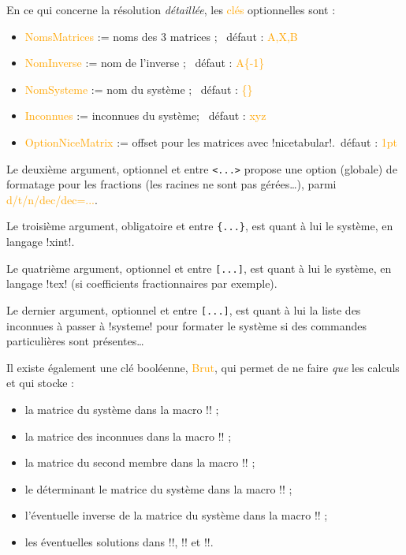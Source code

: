 \documentclass[french,a4paper,11pt]{article}
\newcommand\Cle[1]{{\small\sffamily\textlangle \textcolor{orange}{#1}\textrangle}}
\begin{document}
{{\begin{tipblock}
En ce qui concerne la résolution \textit{détaillée}, les \Cle{clés} optionnelles sont :

\begin{itemize}
	\item \Cle{NomsMatrices} := noms des 3 matrices ; \hfill~défaut : \Cle{A,X,B}
	\item \Cle{NomInverse} := nom de l'inverse ; \hfill~défaut : \Cle{A\{-1\}}
	\item \Cle{NomSysteme} := nom du système ; \hfill~défaut : \Cle{\{\}}
	\item \Cle{Inconnues} := inconnues du système; \hfill~défaut : \Cle{xyz}
	\item \Cle{OptionNiceMatrix} := offset pour les matrices avec \motcletex!nicetabular!.\hfill~défaut : \Cle{1pt}
\end{itemize}

Le deuxième argument, optionnel et entre \texttt{<...>} propose une option (globale) de formatage pour les fractions (les racines ne sont pas gérées\ldots), parmi \Cle{d/t/n/dec/dec=...}.

\smallskip

Le troisième argument, obligatoire et entre \texttt{\{...\}}, est quant à lui le système, en langage \motcletex!xint!.

\smallskip

Le quatrième argument, optionnel et entre \texttt{[...]}, est quant à lui le système, en langage \motcletex!tex! (si coefficients fractionnaires par exemple).

\smallskip

Le dernier argument, optionnel et entre \texttt{[...]}, est quant à lui la liste des inconnues à passer à \motcletex!systeme! pour formater le système si des commandes particulières sont présentes\ldots
\end{tipblock}

\begin{tipblock}
Il existe également une clé booléenne, \Cle{Brut}, qui permet de ne faire \textit{que} les calculs et qui stocke :

\begin{itemize}
	\item la matrice du système dans la macro \motcletex!\ResolMatA! ;
	\item la matrice des inconnues dans la macro \motcletex!\ResolMatX! ;
	\item la matrice du second membre dans la macro \motcletex!\ResolMatB! ;
	\item le déterminant le matrice du système dans la macro \motcletex!\ResolDet! ;
	\item l'éventuelle inverse de la matrice du système dans la macro \motcletex!\ResolInvMatA! ;
	\item les éventuelles solutions dans \motcletex!\ResolSolX!, \motcletex!\ResolSolY! et \motcletex!\ResolSolZ!.
\end{itemize}
\vspace*{-\baselineskip}\leavevmode
\end{tipblock}

}}
\end{document}
